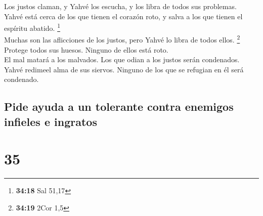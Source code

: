  Los justos claman, y Yahvé los escucha, y los libra de
todos sus problemas.\\
 Yahvé está cerca de los que tienen el corazón roto, y
salva a los que tienen el espíritu abatido. \footnote{\textbf{34:18} Sal
  51,17}\\
 Muchas son las aflicciones de los justos, pero Yahvé lo
libra de todos ellos. \footnote{\textbf{34:19} 2Cor 1,5}\\
 Protege todos sus huesos. Ninguno de ellos está roto.\\
 El mal matará a los malvados. Los que odian a los justos
serán condenados.\\
 Yahvé redimeel alma de sus siervos. Ninguno de los que
se refugian en él será condenado.

\hypertarget{pide-ayuda-a-un-tolerante-contra-enemigos-infieles-e-ingratos}{%
\subsection{Pide ayuda a un tolerante contra enemigos infieles e
ingratos}\label{pide-ayuda-a-un-tolerante-contra-enemigos-infieles-e-ingratos}}

\hypertarget{section-34}{%
\section{35}\label{section-34}}

